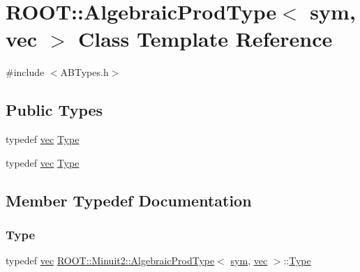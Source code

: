 \hypertarget{classROOT_1_1Minuit2_1_1AlgebraicProdType_3_01sym_00_01vec_01_4}{}\section{R\+O\+OT\+:\+:Algebraic\+Prod\+Type$<$ sym, vec $>$ Class Template Reference}
\label{classROOT_1_1Minuit2_1_1AlgebraicProdType_3_01sym_00_01vec_01_4}


{\ttfamily \#include $<$A\+B\+Types.\+h$>$}

\subsection*{Public Types}
\begin{DoxyCompactItemize}
\item 
typedef \mbox{\hyperlink{classROOT_1_1Minuit2_1_1vec}{vec}} \mbox{\hyperlink{classROOT_1_1Minuit2_1_1AlgebraicProdType_3_01sym_00_01vec_01_4_ad796e20c26ea6b960299e66820ca3c2c}{Type}}
\item 
typedef \mbox{\hyperlink{classROOT_1_1Minuit2_1_1vec}{vec}} \mbox{\hyperlink{classROOT_1_1Minuit2_1_1AlgebraicProdType_3_01sym_00_01vec_01_4_ad796e20c26ea6b960299e66820ca3c2c}{Type}}
\end{DoxyCompactItemize}


\subsection{Member Typedef Documentation}
\mbox{\label{classROOT_1_1Minuit2_1_1AlgebraicProdType_3_01sym_00_01vec_01_4_ad796e20c26ea6b960299e66820ca3c2c}} 
\subsubsection{\texorpdfstring{Type}{Type}\hspace{0.1cm}{\footnotesize\ttfamily [1/2]}}
{\footnotesize\ttfamily typedef \mbox{\hyperlink{classROOT_1_1Minuit2_1_1vec}{vec}} \mbox{\hyperlink{classROOT_1_1Minuit2_1_1AlgebraicProdType}{R\+O\+O\+T\+::\+Minuit2\+::\+Algebraic\+Prod\+Type}}$<$ \mbox{\hyperlink{classROOT_1_1Minuit2_1_1sym}{sym}}, \mbox{\hyperlink{classROOT_1_1Minuit2_1_1vec}{vec}} $>$\+::\mbox{\hyperlink{classROOT_1_1Minuit2_1_1AlgebraicProdType_3_01sym_00_01vec_01_4_ad796e20c26ea6b960299e66820ca3c2c}{Type}}}

